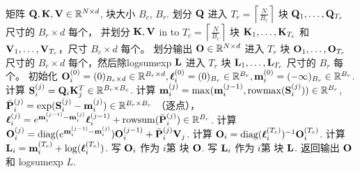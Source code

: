 \documentclass{article} %
\begin{document}
\begin{algorithm}[h!]
  \caption{Flash Attention：前向过程}\label{alg:fa_forward}
  \begin{algorithmic}[1]
    \REQUIRE 矩阵 ${\mathbf{Q}}, {\mathbf{K}}, {\mathbf{V}} \in \mathbb{R}^{N \times d}$, 块大小 $B_c$, $B_r$.
    \STATE \label{alg:stream_attn_split_qkv} 划分 ${\mathbf{Q}}$ 进入 $T_r = \left\lceil\frac{N}{B_r} \right\rceil$ 块 ${\mathbf{Q}}_1, \dots, {\mathbf{Q}}_{T_r}$ 尺寸的 $B_r \times d$ 每个，
    并划分 ${\mathbf{K}}, {\mathbf{V}}$ in to $T_c = \left\lceil \frac{N}{B_c} \right\rceil$ 块 ${\mathbf{K}}_1, \dots, {\mathbf{K}}_{T_c}$ 和
    ${\mathbf{V}}_1, \dots, {\mathbf{V}}_{T_c}$，尺寸 $B_c \times d$ 每个。
    \STATE 划分输出 ${\mathbf{O}} \in \mathbb{R}^{N \times d}$ 进入 $T_r$ 块 ${\mathbf{O}}_1, \dots, {\mathbf{O}}_{T_r}$ 尺寸的
    $B_r \times d$ 每个，然后除logsumexp ${\mathbf{L}}$ 进入 $T_r$ 块 ${\mathbf{L}}_1, \dots, {\mathbf{L}}_{T_r}$ 尺寸的
    $B_r$ 每个。
     \label{alg:stream_attn_outer_loop}
      \STATE 初始化 ${\mathbf{O}}_{i}^{(0)} = (0)_{B_r \times d} \in \mathbb{R}^{B_r \times d}, {\boldsymbol{\ell}}_{i}^{(0)} = (0)_{B_r} \in \mathbb{R}^{B_r}, {\mathbf{m}}_{i}^{(0)} = (-\infty)_{B_r} \in \mathbb{R}^{B_r}$.
        \STATE 计算 ${\mathbf{S}}_{i}^{(j)} = {\mathbf{Q}}_i {\mathbf{K}}_j^T \in \mathbb{R}^{B_r \times B_c}$.
        \STATE 计算
        ${\mathbf{m}}_{i}^{(j)} = \mathrm{max}({\mathbf{m}}_{i}^{(j-1)}, \mathrm{rowmax}({\mathbf{S}}_{i}^{(j)})) \in \mathbb{R}^{B_r}$, $\bar{{\mathbf{P}}}_{i}^{(j)} = \exp({\mathbf{S}}_{i}^{(j)} - {\mathbf{m}}_{i}^{(j)}) \in \mathbb{R}^{B_r \times B_c}$ （逐点），
        ${\boldsymbol{\ell}}_{i}^{(j)} = e^{{\mathbf{m}}_{i}^{(j-1)} - {\mathbf{m}}_{i}^{(j)}} {\boldsymbol{\ell}}_{i}^{(j-1)} + \mathrm{row sum}(\bar{{\mathbf{P}}}_{i}^{(j)}) \in \mathbb{R}^{B_r}$.
        \STATE 计算
        ${\mathbf{O}}_{i}^{(j)} = \text{diag}(e^{{\mathbf{m}}_{i}^{(j-1)} - {\mathbf{m}}_{i}^{(j)}}) {\mathbf{O}}_{i}^{(j-1)} + \bar{{\mathbf{P}}}_{i}^{(j)} {\mathbf{V}}_j$.
      \ENDFOR
      \STATE 计算 ${\mathbf{O}}_{i} = \text{diag}({\boldsymbol{\ell}}_{i}^{(T_c)})^{-1} {\mathbf{O}}_{i}^{(T_c)}$.
      \STATE 计算 ${\mathbf{L}}_{i} = {\mathbf{m}}_{i}^{(T_c)} + \log({\boldsymbol{\ell}}_{i}^{(T_c)})$.
      \STATE 写 ${\mathbf{O}}_{i}$ 作为 $i$第 块 ${\mathbf{O}}$.
      \STATE 写 ${\mathbf{L}}_{i}$ 作为 $i$第 块 ${\mathbf{L}}$.
    \ENDFOR
    \STATE 返回输出 ${\mathbf{O}}$ 和 logsumexp $L$.
  \end{algorithmic}
\end{algorithm}
\end{document}
